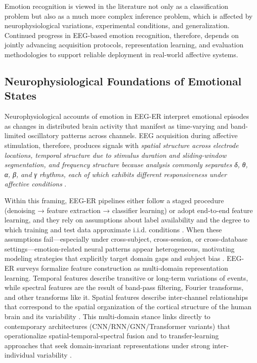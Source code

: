 \documentclass{WileyMSP-template}
\begin{document}
Emotion recognition is viewed in the literature not only as a classification problem but also as a much more complex inference problem, which is affected by neurophysiological variations, experimental conditions, and generalization. Continued progress in EEG-based emotion recognition, therefore, depends on jointly advancing acquisition protocols, representation learning, and evaluation methodologies to support reliable deployment in real-world affective systems.

\subsection{Neurophysiological Foundations of Emotional States}
Neurophysiological accounts of emotion in EEG-ER interpret emotional episodes as changes in distributed brain activity that manifest as time-varying and band-limited oscillatory patterns across channels. EEG acquisition during affective stimulation, therefore, produces signals with \emph{spatial structure across electrode locations, temporal structure due to stimulus duration and sliding-window segmentation, and frequency structure because analysis commonly separates δ, θ, α, β, and γ rhythms, each of which exhibits different responsiveness under affective conditions} \cite{wang2024researchprogress}.

Within this framing, EEG-ER pipelines either follow a staged procedure (denoising → feature extraction → classifier learning) or adopt end-to-end feature learning, and they rely on assumptions about label availability and the degree to which training and test data approximate i.i.d. conditions \cite{li2022transferreview}. When these assumptions fail—especially under cross-subject, cross-session, or cross-database settings—emotion-related neural patterns appear heterogeneous, motivating modeling strategies that explicitly target domain gaps and subject bias \cite{li2022transferreview}.
EEG-ER surveys formalize feature construction as multi-domain representation learning. Temporal features describe transitive or long-term variations of events, while spectral features are the result of band-pass filtering, Fourier transforms, and other transforms like it. Spatial features describe inter-channel relationships that correspond to the spatial organization of the cortical structure of the human brain and its variability \cite{wang2024researchprogress}. This multi-domain stance links directly to contemporary architectures (CNN/RNN/GNN/Transformer variants) that operationalize spatial-temporal-spectral fusion and to transfer-learning approaches that seek domain-invariant representations under strong inter-individual variability \cite{geng2025dlreview}.
\end{document}
